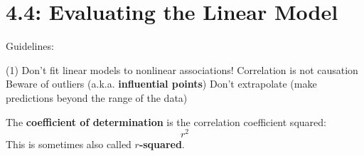 \documentclass[../mathNotesPreamble]{subfiles}
\begin{document}
  \section{4.4: Evaluating the Linear Model}
    Guidelines:
    \begin{tasks}[after-item-skip=\stretch{1}, label=\textbullet](1)
      \task Don't fit linear models to nonlinear associations!
      \task Correlation is not causation
      \task Beware of outliers (a.k.a. \textbf{influential points})
      \task Don't extrapolate (make predictions beyond the range of the data)
    \end{tasks}

    \begin{defn*}
      The \textbf{coefficient of determination} is the correlation coefficient squared:
        \[r^2\]
      This is sometimes also called \textbf{$r$-squared}.
    \end{defn*}

  \pagebreak
\end{document}
